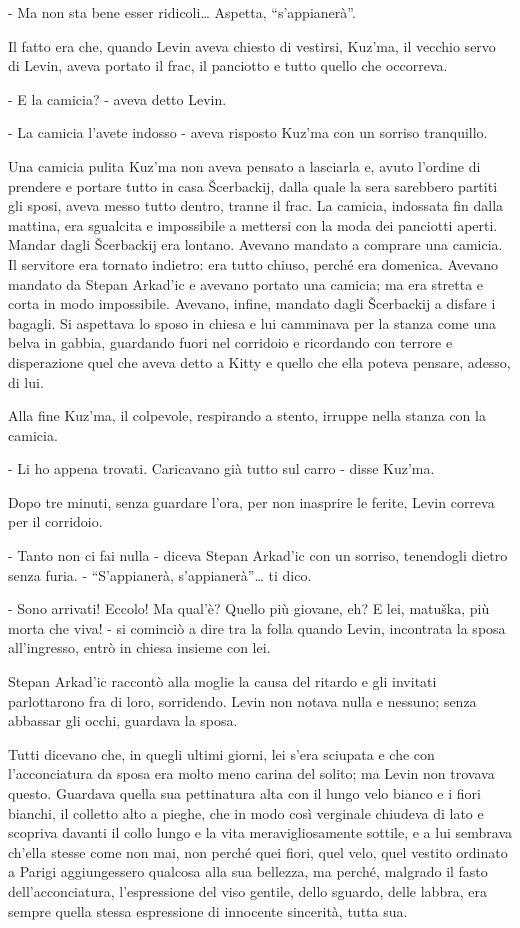 - Ma non sta bene esser ridicoli\ldots{} Aspetta, ``s'appianerà''. 

Il fatto era che, quando Levin aveva chiesto di vestirsi, Kuz'ma, il vecchio servo di Levin, aveva portato il frac, il panciotto e tutto quello che occorreva. 

- E la camicia? - aveva detto Levin. 

- La camicia l'avete indosso - aveva risposto Kuz'ma con un sorriso tranquillo. 

Una camicia pulita Kuz'ma non aveva pensato a lasciarla e, avuto l'ordine di prendere e portare tutto in casa Šcerbackij, dalla quale la sera sarebbero partiti gli sposi, aveva messo tutto dentro, tranne il frac. La camicia, indossata fin dalla mattina, era sgualcita e impossibile a mettersi con la moda dei panciotti aperti. Mandar dagli Šcerbackij era lontano. Avevano mandato a comprare una camicia. Il servitore era tornato indietro: era tutto chiuso, perché era domenica. Avevano mandato da Stepan Arkad'ic e avevano portato una camicia; ma era stretta e corta in modo impossibile. Avevano, infine, mandato dagli Šcerbackij a disfare i bagagli. Si aspettava lo sposo in chiesa e lui camminava per la stanza come una belva in gabbia, guardando fuori nel corridoio e ricordando con terrore e disperazione quel che aveva detto a Kitty e quello che ella poteva pensare, adesso, di lui. 

Alla fine Kuz'ma, il colpevole, respirando a stento, irruppe nella stanza con la camicia. 

- Li ho appena trovati. Caricavano già tutto sul carro - disse Kuz'ma. 

Dopo tre minuti, senza guardare l'ora, per non inasprire le ferite, Levin correva per il corridoio. 

- Tanto non ci fai nulla - diceva Stepan Arkad'ic con un sorriso, tenendogli dietro senza furia. - ``S'appianerà, s'appianerà''\ldots{} ti dico. 

\label{iv-4} 

- Sono arrivati! Eccolo! Ma qual'è? Quello più giovane, eh? E lei, matuška, più morta che viva! - si cominciò a dire tra la folla quando Levin, incontrata la sposa all'ingresso, entrò in chiesa insieme con lei. 

Stepan Arkad'ic raccontò alla moglie la causa del ritardo e gli invitati parlottarono fra di loro, sorridendo. Levin non notava nulla e nessuno; senza abbassar gli occhi, guardava la sposa. 

Tutti dicevano che, in quegli ultimi giorni, lei s'era sciupata e che con l'acconciatura da sposa era molto meno carina del solito; ma Levin non trovava questo. Guardava quella sua pettinatura alta con il lungo velo bianco e i fiori bianchi, il colletto alto a pieghe, che in modo così verginale chiudeva di lato e scopriva davanti il collo lungo e la vita meravigliosamente sottile, e a lui sembrava ch'ella stesse come non mai, non perché quei fiori, quel velo, quel vestito ordinato a Parigi aggiungessero qualcosa alla sua bellezza, ma perché, malgrado il fasto dell'acconciatura, l'espressione del viso gentile, dello sguardo, delle labbra, era sempre quella stessa espressione di innocente sincerità, tutta sua. 

